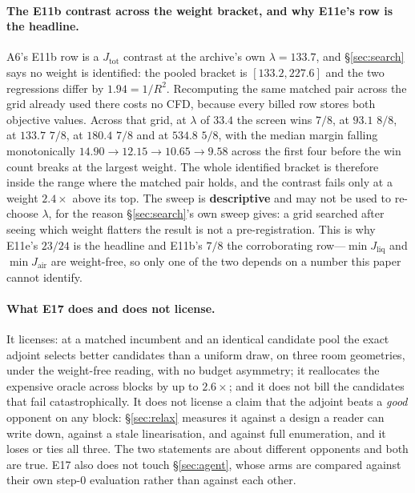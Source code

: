 \documentclass{article}
\newcommand{\Jliq}{J_{\mathrm{liq}}}
\newcommand{\Jair}{J_{\mathrm{air}}}
\newcommand{\Jtot}{J_{\mathrm{tot}}}
\begin{document}
\paragraph{The E11b contrast across the weight bracket, and why E11e's row is the headline.}
A6's E11b row is a $\Jtot$ contrast at the archive's own $\lambda = 133.7$, and
\S\ref{sec:search} says no weight is identified: the pooled bracket is $[133.2, 227.6]$ and the
two regressions differ by $1.94 = 1/R^2$.  Recomputing the same matched pair across the grid
already used there costs no CFD, because every billed row stores both objective values.  Across
that grid, at $\lambda$ of $33.4$ the screen wins $7/8$, at $93.1$ $8/8$, at $133.7$ $7/8$, at
$180.4$ $7/8$ and at $534.8$ $5/8$, with the median margin falling monotonically
$14.90 \to 12.15 \to 10.65 \to 9.58$ across the first four before the win count breaks at the
largest weight.  The whole
identified bracket is therefore inside the range where the matched pair holds, and the contrast
fails only at a weight $2.4\times$ above its top.  The sweep is \textbf{descriptive} and may not
be used to re-choose $\lambda$, for the reason \S\ref{sec:search}'s own sweep gives: a grid
searched after seeing which weight flatters the result is not a pre-registration.  This is why
E11e's $23/24$ is the headline and E11b's $7/8$ the corroborating row---$\min\Jliq$ and
$\min\Jair$ are weight-free, so only one of the two depends on a number this paper cannot
identify.

\paragraph{What E17 does and does not license.}
It licenses: at a matched incumbent and an identical candidate pool the exact
adjoint selects better candidates than a uniform draw, on three room geometries,
under the weight-free reading, with no budget asymmetry; it reallocates the
expensive oracle across blocks by up to $2.6\times$; and it does not bill the
candidates that fail catastrophically.  It does not license a claim that the adjoint
beats a \emph{good} opponent on any block: \S\ref{sec:relax} measures it against a
design a reader can write down, against a stale linearisation, and against full
enumeration, and it loses or ties all three.  The two statements are about different
opponents and both are true.  E17 also does not touch \S\ref{sec:agent}, whose arms
are compared against their own step-0 evaluation rather than against each other.
\end{document}
